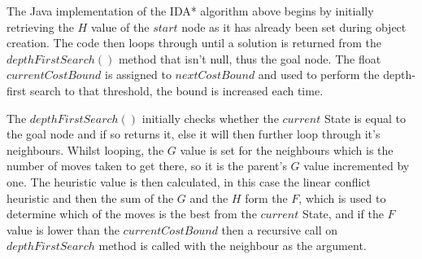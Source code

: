 \documentclass[final]{cmpreport}
\begin{document}
The Java implementation of the IDA* algorithm above begins by initially retrieving the $H$ value of the $start$ node as it has already been set during object creation. The code then loops through until a solution is returned from the $depthFirstSearch()$ method that isn't null, thus the goal node. The float $currentCostBound$ is assigned to $nextCostBound$ and used to perform the depth-first search to that threshold, the bound is increased each time. 

The $depthFirstSearch()$ initially checks whether the $current$ State is equal to the goal node and if so returns it, else it will then further loop through it's neighbours. Whilst looping, the $G$ value is set 
for the neighbours which is the number of moves taken to get there, so it is the parent's $G$ value incremented by one. The heuristic value is then calculated, in this case the linear conflict heuristic and then the sum of the $G$ and the $H$ form the $F$, which is used to determine which of the moves is the best from the $current$ State, and if the $F$ value is lower than the $currentCostBound$ then a recursive call on $depthFirstSearch$ method is called with the neighbour as the argument. 
\end{document}
